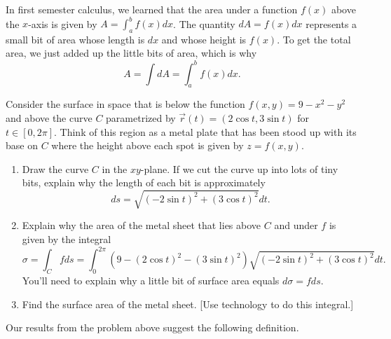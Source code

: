 In first semester calculus, we learned that the area under a function $f(x)$ above the $x$-axis is given by $A = \int_a^b f(x) dx$.  The quantity $dA= f(x) dx$ represents a small bit of area whose length is $dx$ and whose height is $f(x)$.  To get the total area, we just added up the little bits of area, which is why 
$$A=\int dA = \int_a^b f(x) dx.$$

\begin{problem}
%
%
 Consider the surface in space that is below the function 
$f(x,y)=9-x^2-y^2$ and above the curve $C$ parametrized by 
$\vec r(t)=(2\cos t, 3\sin t)$ for $t\in[0,2\pi]$.  Think of this region as a metal plate that has been stood up with its base on $C$ where the height above each spot is given by $z=f(x,y)$.
\begin{enumerate}
 \item {}%
  Draw the curve $C$ in the $xy$-plane. If we cut the curve up into lots of tiny bits, explain why the length of each bit is approximately $$ds=\sqrt{(-2\sin t)^2+(3\cos t)^2}dt.$$
 \item Explain why the area of the metal sheet that lies above $C$ and under $f$ is given by the integral
$$\sigma = \int_C f ds = \int_0^{2\pi}(9-(2\cos t)^2-(3\sin t)^2)\sqrt{(-2\sin t)^2+(3\cos t)^2}dt.$$
 You'll need to explain why a little bit of surface area equals $d\sigma =fds$. 
 \item
{}%
Find the surface area of the metal sheet. [Use technology to do this integral.] 
\end{enumerate}
\end{problem}


Our results from the problem above suggest the following definition.

